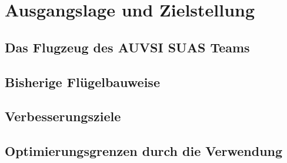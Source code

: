 \chapter{Ausgangslage und Zielstellung}\label{cha:Ausgangslage und Zielstellung}

\section{Das Flugzeug des AUVSI SUAS Teams}


\section{Bisherige Flügelbauweise}


\section{Verbesserungsziele}

\section{Optimierungsgrenzen durch die Verwendung}